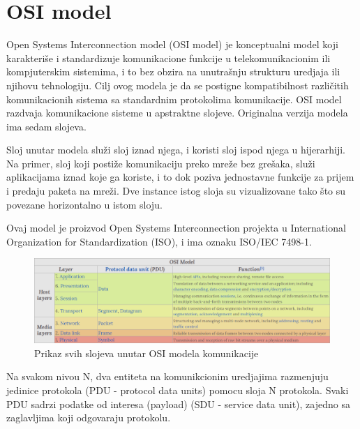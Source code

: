 \documentclass[a4paper,12pt, master]{etf}
\begin{document}
	\section{OSI model}

	Open Systems Interconnection model (OSI model) je konceptualni model koji karakteri\v{s}e i
	standardizuje komunikacione funkcije u telekomunikacionim ili kompjuterskim sistemima, i
	to bez obzira na unutra\v{s}nju strukturu uredjaja ili njihovu tehnologiju. Cilj ovog modela
	je da se postigne kompatibilnost razli\v{c}itih komunikacionih sistema sa standardnim
	protokolima komunikacije. OSI model razdvaja komunikacione sisteme u apstraktne slojeve.
	Originalna verzija modela ima sedam slojeva.

	Sloj unutar modela slu\v{z}i sloj iznad njega, i koristi sloj ispod njega u hijerarhiji. Na
	primer, sloj koji posti\v{z}e komunikaciju preko mre\v{z}e bez gre\v{s}aka, slu\v{z}i aplikacijama iznad
	koje ga koriste, i to dok poziva jednostavne funkcije za prijem i predaju paketa na mre\v{z}i.
	Dve instance istog sloja su vizualizovane tako \v{s}to su povezane horizontalno u istom sloju.

	Ovaj model je proizvod Open Systems Interconnection projekta u International Organization
	for Standardization (ISO), i ima oznaku ISO/IEC 7498-1.

        \begin{figure}[htb]
                \centering
                \includegraphics[scale=.43]{../pic/osi_model.png}
                \caption{Prikaz svih slojeva unutar OSI modela komunikacije}
                \label{fig:osi_model}
        \end{figure}

	Na svakom nivou N, dva entiteta na komunikcionim uredjajima razmenjuju jedinice protokola
	(PDU - protocol data units) pomocu sloja N protokola. Svaki PDU sadrzi podatke od interesa
	(payload) (SDU - service data unit), zajedno sa zaglavljima koji odgovaraju protokolu.
\end{document}
